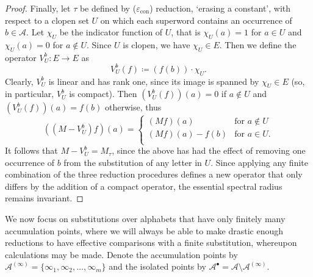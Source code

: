 \documentclass[11pt]{amsart}
\numberwithin{equation}{section}
\theoremstyle{plain}
\theoremstyle{definition}
\newcommand{\mc}{\mathcal}
\newcommand{\A}{\mc A}
\begin{document}
\begin{proof}
Finally, let \(\tau\) be defined by (\(\varepsilon_\mathrm{con}\)) reduction, `erasing a constant', with respect to a clopen set \(U\) on which each superword contains an occurrence of \(b \in \A\). Let \(\chi_U\) be the indicator function of \(U\), that is \(\chi_U(a) = 1\) for \(a \in U\) and \(\chi_U(a) = 0\) for \(a \notin U\). Since \(U\) is clopen, we have \(\chi_U \in E\). Then we define the operator \(V_U^b \colon E \to E\) as
\[
V_U^b(f) \coloneqq (f(b)) \cdot \chi_U .
\]
Clearly, \(V_U^b\) is linear and has rank one, since its image is spanned by \(\chi_U \in E\) (so, in particular, \(V_U^b\) is compact). Then \((V_U^b(f))(a) = 0\) if \(a \notin U\) and \((V_U^b(f))(a) = f(b)\) otherwise, thus
\[
((M - V_U^b)f)(a) =
\begin{cases}
(Mf)(a)        & \text{for } a \notin U \\
(Mf)(a) - f(b) & \text{for } a \in U . \\
\end{cases}
\]
It follows that \(M-V_U^b = M_\tau\), since the above has had the effect of removing one occurrence of \(b\) from the substitution of any letter in \(U\). Since applying any finite combination of the three reduction procedures defines a new operator that only differs by the addition of a compact operator, the essential spectral radius remains invariant.
\end{proof}

We now focus on substitutions over alphabets that have only finitely many accumulation points, where we will always be able to make drastic enough reductions to have effective comparisons with a finite substitution, whereupon calculations may be made. Denote the accumulation points by \(\A^{(\infty)} = \{\infty_1,\infty_2,\ldots,\infty_m\}\) and the isolated points by \(\A^\bullet = \A \setminus \A^{(\infty)}\).
\end{document}
